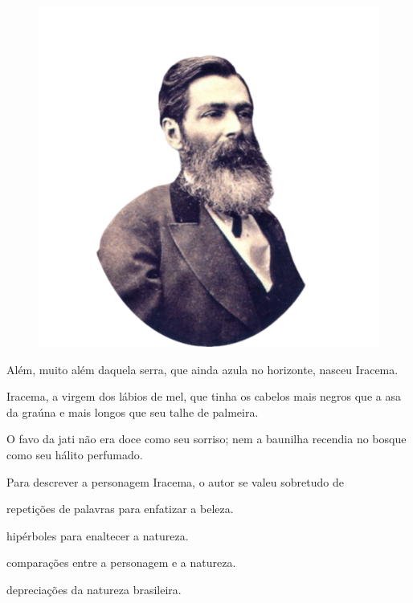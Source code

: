 \begin{myquote}

\begin{figure}[H]
\centering
\includegraphics[scale=0.25]{./imgSAEB_7_POR/media/image52.png}
\end{figure}

Além, muito além daquela serra, que ainda azula no
horizonte, nasceu Iracema.

Iracema, a virgem dos lábios de mel, que tinha os
cabelos mais negros que a asa da graúna e mais longos
que seu talhe de palmeira.

O favo da jati não era doce como seu sorriso; nem
a baunilha recendia no bosque como seu hálito perfumado.


\end{myquote}


Para descrever a personagem Iracema, o autor se valeu sobretudo de

\begin{escolha}

  \item repetições de palavras para enfatizar a beleza. 

  \item hipérboles para enaltecer a natureza.

  \item comparações entre a personagem e a natureza.

  \item depreciações da natureza brasileira.

\end{escolha}


